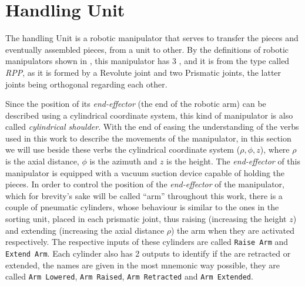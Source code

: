 \section{Handling Unit}
\label{sec:handlingUnit}
The handling Unit is a robotic manipulator that serves to transfer the pieces
and eventually assembled pieces, from a unit to other. By the definitions of
robotic manipulators shown in \cite{khalil2004modeling}, this manipulator has 3
\DOF{}, and it is from the type called \emph{RPP}, as
it is formed by a Revolute joint and two Prismatic joints, the latter joints
being orthogonal regarding each other.

Since the position of its
\emph{end-effector} (the end of the robotic arm) can be described using a
cylindrical coordinate system, this kind of manipulator is also called
\emph{cylindrical shoulder}. With the end of easing the understanding of the
verbs used in this work to describe the movements of the manipulator, in this
section we will use beside these verbs the cylindrical coordinate
system ($\rho,\phi,z$), where $\rho$ is the axial distance, $\phi$ is the azimuth
and $z$ is the height.
The \emph{end-effector} of this manipulator is equipped with a vacuum suction
device capable of holding the pieces. In order to control the position of the \emph{end-effector} of the manipulator, which for brevity's sake will be called
``arm'' throughout this work, there is a couple of pneumatic cylinders, whose
behaviour is similar
to the ones in the sorting unit, placed in each
prismatic joint, thus raising (increasing the height $z$) and extending (increasing the
axial distance $\rho$) the arm when they are activated respectively. The
respective inputs
of these cylinders are called \verb|Raise Arm| and \verb|Extend Arm|. Each
cylinder also has 2 outputs to identify if the are retracted or extended, the
names are given in the most mnemonic way possible, they are called
\verb|Arm Lowered|, \verb|Arm Raised|, \verb|Arm Retracted| and
\verb|Arm Extended|.

